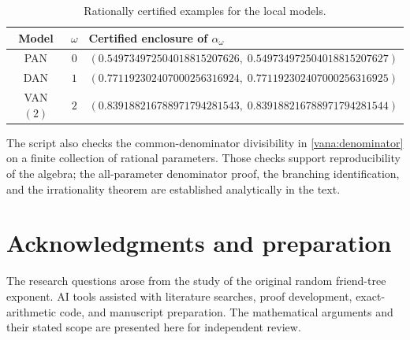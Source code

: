 \documentclass[11pt]{article}
\theoremstyle{definition}
\theoremstyle{remark}
\numberwithin{equation}{section}
\begin{document}
\begin{table}[htbp]
\centering
\small
\begin{tabular}{@{}ccl@{}}
\toprule
Model & $\omega$ & Certified enclosure of $\alpha_\omega$ \\
\midrule
PAN & $0$ & $(0.549734972504018815207626,\;0.549734972504018815207627)$ \\
DAN & $1$ & $(0.771192302407000256316924,\;0.771192302407000256316925)$ \\
VAN$(2)$ & $2$ & $(0.839188216788971794281543,\;0.839188216788971794281544)$ \\
\bottomrule
\end{tabular}
\caption{Rationally certified examples for the local models.}
\label{comp:table}
\end{table}

The script also checks the common-denominator divisibility in
\eqref{vana:denominator} on a finite collection of rational parameters.
Those checks support reproducibility of the algebra; the
all-parameter denominator proof, the branching identification, and
the irrationality theorem are established analytically in the text.

\section*{Acknowledgments and preparation}
The research questions arose from the study of the original random
friend-tree exponent. AI tools assisted with literature searches,
proof development, exact-arithmetic code, and manuscript preparation.
The mathematical arguments and their stated scope are presented here
for independent review.
\end{document}
